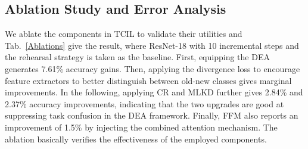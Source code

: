 \documentclass[letterpaper]{article} %
\begin{document}
 \begin{table}
    \centering
    \caption{Ablations on the components of TCIL}
    \label{Ablations}
\end{table}

\subsection{Ablation Study and Error Analysis}
We ablate the components in TCIL to validate their utilities and Tab.~\ref{Ablations} give the result, where ResNet-18 with 10 incremental steps and the rehearsal strategy is taken as the baseline. First, equipping the DEA generates 7.61\% accuracy gains. Then, applying the divergence loss to encourage feature extractors to better distinguish between old-new classes gives marginal improvements. In the following, applying CR and MLKD further gives 2.84\% and 2.37\% accuracy improvements, indicating that the two upgrades are good at suppressing task confusion in the DEA framework. Finally, FFM also reports an improvement of 1.5\% by injecting the combined attention mechanism. The ablation basically verifies the effectiveness of the employed components.
\end{document}
